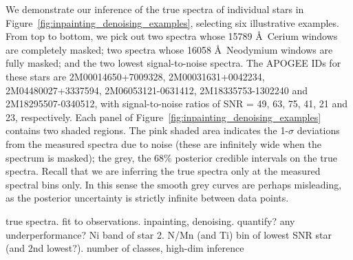 \documentclass[a4paper,fleqn,usenatbib]{mnras}
\begin{document}
We demonstrate our inference of the true spectra of individual stars in Figure~\ref{fig:inpainting_denoising_examples}, selecting six illustrative examples. From top to bottom, we pick out two spectra whose 15789 \AA\ Cerium windows are completely masked; two spectra whose 16058 \AA\ Neodymium windows are fully masked; and the two lowest signal-to-noise spectra. The APOGEE IDs for these stars are 2M00014650+7009328, 2M00031631+0042234, 2M04480027+3337594, 2M06053121-0631412, 2M18335753-1302240 and 2M18295507-0340512, with signal-to-noise ratios of SNR = 49, 63, 75, 41, 21 and 23, respectively. Each panel of Figure~\ref{fig:inpainting_denoising_examples} contains two shaded regions. The pink shaded area indicates the 1-$\sigma$ deviations from the measured spectra due to noise (these are infinitely wide when the spectrum is masked); the grey, the 68\% posterior credible intervals on the true spectra. Recall that we are inferring the true spectra only at the measured spectral bins only. In this sense the smooth grey curves are perhaps misleading, as the posterior uncertainty is strictly infinite between data points.
 
true spectra. fit to observations. inpainting, denoising. quantify? any underperformance? Ni band of star 2. N/Mn (and Ti) bin of lowest SNR star (and 2nd lowest?).
number of classes, high-dim inference
\end{document}
